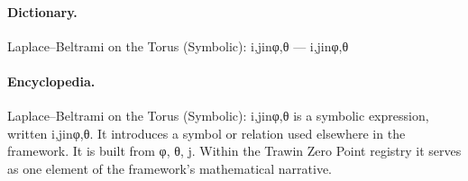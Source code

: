 \paragraph{Dictionary.}
Laplace–Beltrami on the Torus (Symbolic): i,jinφ,θ — i,jinφ,θ

\paragraph{Encyclopedia.}
Laplace–Beltrami on the Torus (Symbolic): i,jinφ,θ is a symbolic expression, written i,jinφ,θ. It introduces a symbol or relation used elsewhere in the framework. It is built from φ, θ, j. Within the Trawin Zero Point registry it serves as one element of the framework's mathematical narrative.
